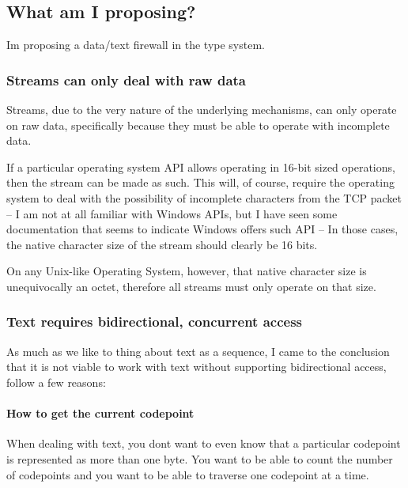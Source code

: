 \subsection*{What am I proposing?}

I\textquotesingle{}m proposing a data/text firewall in the type system.

\subsubsection*{Streams can only deal with raw data}

Streams, due to the very nature of the underlying mechanisms, can only operate on raw data, specifically because they must be able to operate with incomplete data.

If a particular operating system A\+PI allows operating in 16-\/bit sized operations, then the stream can be made as such. This will, of course, require the operating system to deal with the possibility of incomplete \textquotesingle{}characters\textquotesingle{} from the T\+CP packet -- I am not at all familiar with Windows A\+P\+Is, but I have seen some documentation that seems to indicate Windows offers such A\+PI -- In those cases, the \textquotesingle{}native character size\textquotesingle{} of the stream should clearly be 16 bits.

On any Unix-\/like Operating System, however, that \textquotesingle{}native character size\textquotesingle{} is unequivocally an octet, therefore all streams must only operate on that size.

\subsubsection*{Text requires bidirectional, concurrent access}

As much as we like to thing about text as a sequence, I came to the conclusion that it is not viable to work with text without supporting bidirectional access, follow a few reasons\+:

\paragraph*{How to get the current \textquotesingle{}codepoint\textquotesingle{}}

When dealing with text, you don\textquotesingle{}t want to even know that a particular codepoint is represented as more than one byte. You want to be able to count the number of codepoints and you want to be able to traverse one codepoint at a time.

